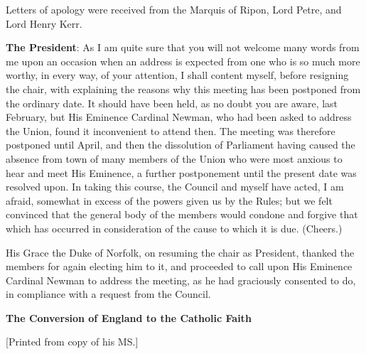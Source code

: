 Letters of apology were received from the Marquis of Ripon, Lord
Petre, and Lord Henry Kerr.

\textbf{The President}: As I am quite
sure that you will not welcome many words from me upon an occasion
when an address is expected from one who is so much more worthy, in
every way, of your attention, I shall content myself, before resigning
the chair, with explaining the reasons why this meeting has been
postponed from the ordinary date. It should have been held, as no
doubt you are aware, last February, but His Eminence Cardinal Newman,
who had been asked to address the Union, found it inconvenient to
attend then. The meeting was therefore postponed until April, and then
the dissolution of Parliament having caused the absence from town of
many members of the Union who were most anxious to hear and meet His
Eminence, a further postponement until the present date was resolved
upon. In taking this course, the Council and myself have acted, I am
afraid, somewhat in excess of the powers given us by the Rules; but we
felt convinced that the general body of the members would condone and
forgive that which has occurred in consideration of the cause to which
it is due. (Cheers.)

His Grace the Duke of Norfolk, on resuming the chair
as President, thanked the members for again electing him to it, and
proceeded to call upon His Eminence Cardinal Newman to address the
meeting, as he had graciously consented to do, in compliance with a
request from the Council.


\textbf{The Conversion of England
to the Catholic Faith}

[Printed from copy of his MS.]

